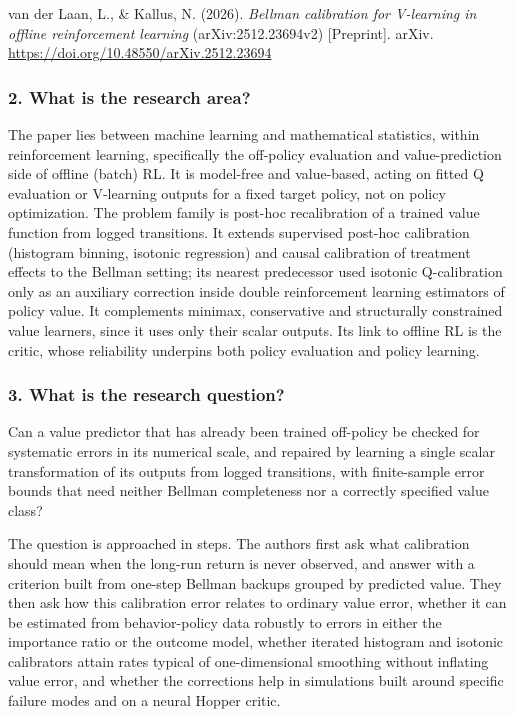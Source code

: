 \documentclass[11pt]{article}
\newenvironment{hangref}{\par\hangindent=0.5in\hangafter=1\noindent}{\par}
\newcommand{\question}[1]{\subsubsection*{#1}}
\begin{document}
\begin{hangref}van der Laan, L., \& Kallus, N. (2026). \emph{Bellman calibration for V-learning in offline reinforcement learning} (arXiv:2512.23694v2) [Preprint]. arXiv. \url{https://doi.org/10.48550/arXiv.2512.23694}\end{hangref}

\question{2. What is the research area?}

The paper lies between machine learning and mathematical statistics, within reinforcement learning, specifically the off-policy evaluation and value-prediction side of offline (batch) RL. It is model-free and value-based, acting on fitted Q evaluation or V-learning outputs for a fixed target policy, not on policy optimization. The problem family is post-hoc recalibration of a trained value function from logged transitions. It extends supervised post-hoc calibration (histogram binning, isotonic regression) and causal calibration of treatment effects to the Bellman setting; its nearest predecessor used isotonic Q-calibration only as an auxiliary correction inside double reinforcement learning estimators of policy value. It complements minimax, conservative and structurally constrained value learners, since it uses only their scalar outputs. Its link to offline RL is the critic, whose reliability underpins both policy evaluation and policy learning.

\question{3. What is the research question?}

Can a value predictor that has already been trained off-policy be checked for systematic errors in its numerical scale, and repaired by learning a single scalar transformation of its outputs from logged transitions, with finite-sample error bounds that need neither Bellman completeness nor a correctly specified value class?

The question is approached in steps. The authors first ask what calibration should mean when the long-run return is never observed, and answer with a criterion built from one-step Bellman backups grouped by predicted value. They then ask how this calibration error relates to ordinary value error, whether it can be estimated from behavior-policy data robustly to errors in either the importance ratio or the outcome model, whether iterated histogram and isotonic calibrators attain rates typical of one-dimensional smoothing without inflating value error, and whether the corrections help in simulations built around specific failure modes and on a neural Hopper critic.
\end{document}
